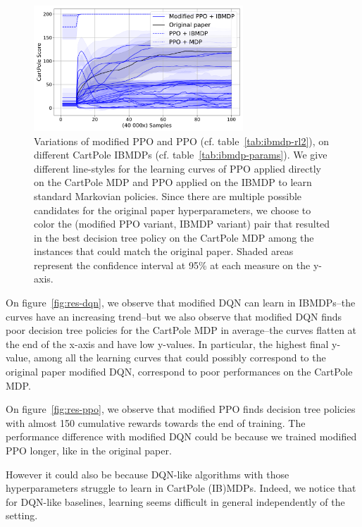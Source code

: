 \begin{figure}
    \centering
    \includegraphics[width=0.7\textwidth]{images/images_part1/ppo.pdf}
    \caption{Variations of modified PPO and PPO (cf. table~\ref{tab:ibmdp-rl2}), on different CartPole IBMDPs (cf. table~\ref{tab:ibmdp-params}). We give different line-styles for the learning curves of PPO applied directly on the CartPole MDP and PPO applied on the IBMDP to learn standard Markovian policies.
    Since there are multiple possible candidates for the original paper hyperparameters, we choose to color the (modified PPO variant, IBMDP variant) pair that resulted in the best decision tree policy on the CartPole MDP among the instances that could match the original paper.
    Shaded areas represent the confidence interval at 95\% at each measure on the y-axis.}
\end{figure}\label{fig:res-ppo}

On figure~\ref{fig:res-dqn}, we observe that modified DQN can learn in IBMDPs--the curves have an increasing trend--but we also observe that modified DQN finds poor decision tree policies for the CartPole MDP in average--the curves flatten at the end of the x-axis and have low y-values.
In particular, the highest final y-value, among all the learning curves that could possibly correspond to the original paper modified DQN, correspond to poor performances on the CartPole MDP.

On figure~\ref{fig:res-ppo}, we observe that modified PPO finds decision tree policies with almost 150 cumulative rewards towards the end of training.
The performance difference with modified DQN could be because we trained modified PPO longer, like in the original paper.

However it could also be because DQN-like algorithms with those hyperparameters struggle to learn in CartPole (IB)MDPs.
Indeed, we notice that for DQN-like baselines, learning seems difficult in general independently of the setting.

